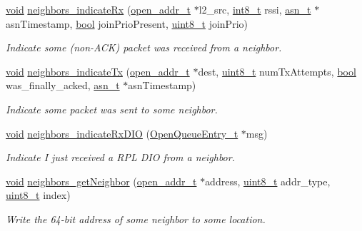 \begin{DoxyCompactItemize}
\hyperlink{usb__devapi_8h_afabf60e7f57651d6d595a02c75f07cd0}{void} \hyperlink{group___neighbors_gaf6850dedabd52cdef3690aee1b1c554c}{neighbors\+\_\+indicate\+Rx} (\hyperlink{structopen__addr__t}{open\+\_\+addr\+\_\+t} $\ast$l2\+\_\+src, \hyperlink{_p_e___types_8h_aef44329758059c91c76d334e8fc09700}{int8\+\_\+t} rssi, \hyperlink{structasn__t}{asn\+\_\+t} $\ast$asn\+Timestamp, \hyperlink{_p_e___types_8h_a97a80ca1602ebf2303258971a2c938e2}{bool} join\+Prio\+Present, \hyperlink{_p_e___types_8h_aba7bc1797add20fe3efdf37ced1182c5}{uint8\+\_\+t} join\+Prio)
\begin{DoxyCompactList}\small\item\em Indicate some (non-\/\+A\+CK) packet was received from a neighbor. \end{DoxyCompactList}\item 
\hyperlink{usb__devapi_8h_afabf60e7f57651d6d595a02c75f07cd0}{void} \hyperlink{group___neighbors_ga8379ad6d1816deed995c75033ffd740a}{neighbors\+\_\+indicate\+Tx} (\hyperlink{structopen__addr__t}{open\+\_\+addr\+\_\+t} $\ast$dest, \hyperlink{_p_e___types_8h_aba7bc1797add20fe3efdf37ced1182c5}{uint8\+\_\+t} num\+Tx\+Attempts, \hyperlink{_p_e___types_8h_a97a80ca1602ebf2303258971a2c938e2}{bool} was\+\_\+finally\+\_\+acked, \hyperlink{structasn__t}{asn\+\_\+t} $\ast$asn\+Timestamp)
\begin{DoxyCompactList}\small\item\em Indicate some packet was sent to some neighbor. \end{DoxyCompactList}\item 
\hyperlink{usb__devapi_8h_afabf60e7f57651d6d595a02c75f07cd0}{void} \hyperlink{group___neighbors_gaa4e24acdf2f814068990c3e535a65164}{neighbors\+\_\+indicate\+Rx\+D\+IO} (\hyperlink{struct_open_queue_entry__t}{Open\+Queue\+Entry\+\_\+t} $\ast$msg)
\begin{DoxyCompactList}\small\item\em Indicate I just received a R\+PL D\+IO from a neighbor. \end{DoxyCompactList}\item 
\hyperlink{usb__devapi_8h_afabf60e7f57651d6d595a02c75f07cd0}{void} \hyperlink{group___neighbors_ga1c1819e3a38fb549a91c495d658b260f}{neighbors\+\_\+get\+Neighbor} (\hyperlink{structopen__addr__t}{open\+\_\+addr\+\_\+t} $\ast$address, \hyperlink{_p_e___types_8h_aba7bc1797add20fe3efdf37ced1182c5}{uint8\+\_\+t} addr\+\_\+type, \hyperlink{_p_e___types_8h_aba7bc1797add20fe3efdf37ced1182c5}{uint8\+\_\+t} index)
\begin{DoxyCompactList}\small\item\em Write the 64-\/bit address of some neighbor to some location. \end{DoxyCompactList}\item 

\end{DoxyCompactItemize}
